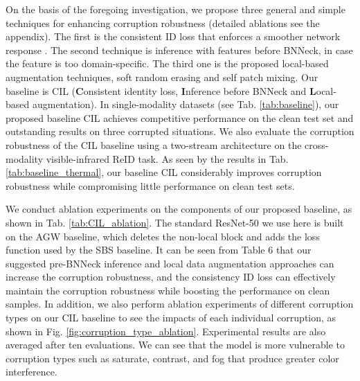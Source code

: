On the basis of the foregoing investigation, we propose three general and simple techniques for enhancing corruption robustness (detailed ablations see the appendix).
The first is the consistent ID loss that enforces a smoother network response \cite{DBLP:conf/iclr/HendrycksMCZGL20}. The second technique is inference with features before BNNeck, in case the feature is too domain-specific. The third one is the proposed local-based augmentation techniques, soft random erasing and self patch mixing.
Our baseline is CIL (\textbf{C}onsistent identity loss, \textbf{I}nference before BNNeck and \textbf{L}ocal-based augmentation).
In single-modality datasets (see Tab. \ref{tab:baseline}), our proposed baseline CIL achieves competitive performance on the clean test set and outstanding results on three corrupted situations.
We also evaluate the corruption robustness of the CIL baseline using a two-stream architecture on the cross-modality visible-infrared ReID task.
As seen by the results in Tab. \ref{tab:baseline_thermal}, our baseline CIL considerably improves corruption robustness while compromising little performance on clean test sets.

We conduct ablation experiments on the components of our proposed baseline, as shown in Tab. \ref{tab:CIL_ablation}. 
The standard ResNet-50 we use here is built on the AGW baseline, which deletes the non-local block and adds the loss function used by the SBS baseline. 
It can be seen from Table 6 that our suggested pre-BNNeck inference and local data augmentation approaches can increase the corruption robustness, and the consistency ID loss can effectively maintain the corruption robustness while boosting the performance on clean samples.
In addition, we also perform ablation experiments of different corruption types on our CIL baseline to see the impacts of each individual corruption, as shown in Fig. \ref{fig:corruption_type_ablation}. 
Experimental results are also averaged after ten evaluations. 
We can see that the model is more vulnerable to corruption types such as saturate, contrast, and fog that produce greater color interference.

